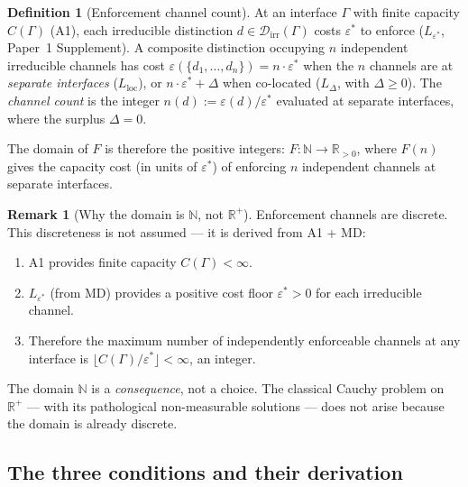 \documentclass[11pt,a4paper]{article}
\theoremstyle{definition}
\newtheorem{definition}[theorem]{Definition}
\newtheorem{remark}[theorem]{Remark}
\begin{document}
\begin{definition}[Enforcement channel count]\label{def:channel_count}
At an interface $\Gamma$ with finite capacity $C(\Gamma)$ (A1), each
irreducible distinction $d \in \mathcal{D}_{\mathrm{irr}}(\Gamma)$ costs
$\varepsilon^*$ to enforce ($L_{\varepsilon^*}$, Paper~1 Supplement).
A composite distinction occupying $n$ independent irreducible channels
has cost $\varepsilon(\{d_1, \ldots, d_n\}) = n \cdot \varepsilon^*$
when the $n$ channels are at \emph{separate interfaces} ($L_{\mathrm{loc}}$),
or $n \cdot \varepsilon^* + \Delta$ when co-located ($L_\Delta$, with
$\Delta \ge 0$).  The \emph{channel count} is the integer
$n(d) := \varepsilon(d) / \varepsilon^*$ evaluated at separate interfaces,
where the surplus $\Delta = 0$.
\end{definition}

\noindent The domain of $F$ is therefore the positive integers:
$F: \mathbb{N} \to \mathbb{R}_{>0}$, where $F(n)$ gives the capacity
cost (in units of $\varepsilon^*$) of enforcing $n$ independent channels
at separate interfaces.

\begin{remark}[Why the domain is $\mathbb{N}$, not $\mathbb{R}^+$]
\label{rem:domain_N}
Enforcement channels are discrete.  This discreteness is not assumed ---
it is derived from A1 + MD:
\begin{enumerate}[label=(\roman*),nosep]
  \item A1 provides finite capacity $C(\Gamma) < \infty$.
  \item $L_{\varepsilon^*}$ (from MD) provides a positive cost floor
        $\varepsilon^* > 0$ for each irreducible channel.
  \item Therefore the maximum number of independently enforceable channels
        at any interface is $\lfloor C(\Gamma) / \varepsilon^* \rfloor
        < \infty$, an integer.
\end{enumerate}
The domain $\mathbb{N}$ is a \emph{consequence}, not a choice.  The
classical Cauchy problem on $\mathbb{R}^+$ --- with its pathological
non-measurable solutions --- does not arise because the domain is
already discrete.
\end{remark}


\subsection{The three conditions and their derivation}
\label{sec:cauchy_conditions}
\end{document}
